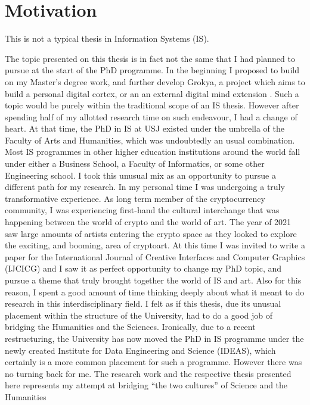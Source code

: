 \section{Motivation}

This is not a typical thesis in Information Systems (IS).

The topic presented on this thesis is in fact not the same that I had planned to pursue at the start of the PhD programme.  In the beginning I proposed to build on my Master's degree work, and further develop Grokya, a project which aims to build a personal digital cortex, or an an external digital mind extension \needcite . Such a topic would be purely within the traditional scope of an IS thesis. However after spending half of my allotted research time on such endeavour, I had a change of heart. At that time, the PhD in IS at USJ existed under the umbrella of the Faculty of Arts and Humanities, which was undoubtedly an usual combination. Most IS programmes in other higher education institutions around the world fall under either a Business School, a Faculty of Informatics, or some other Engineering school. I took this unusual mix as an opportunity to pursue a different path for my research. In my personal time I was undergoing a truly transformative experience. As long term member of the cryptocurrency community, I was experiencing first-hand the cultural interchange that was happening between the world of crypto and the world of art. The year of 2021 saw large amounts of artists entering the crypto space as they looked to explore the exciting, and booming, area of cryptoart. At this time I was invited to write a paper for the International Journal of Creative Interfaces and Computer Graphics (IJCICG) and I saw it as perfect opportunity to change my PhD topic, and pursue a theme that truly brought together the world of IS and art. Also for this reason, I spent a good amount of time thinking deeply about what it meant to do research in this interdisciplinary field. I felt as if this thesis, due its unusual placement within the structure of the University, had to do a good job of bridging the Humanities and the Sciences. Ironically, due to a recent restructuring, the University has now moved the PhD in IS programme under the newly created Institute for Data Engineering and Science (IDEAS), which certainly is a more common placement for such a programme. However there was no turning back for me. The research work and the respective thesis presented here represents my attempt at bridging ``the two cultures'' of Science and the Humanities \cite{snowTwoCultures2012a}

